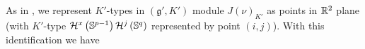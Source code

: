 \documentclass[10pt]{article} %
\theoremstyle{definition}
\begin{document}
	As in \cite{howe1993homogeneous}, we represent $K'$-types in $(\mathfrak{g}',K')$ module $J(\nu)_{K'}$ as points in $\mathbb{R}^2$ plane (with $K'$-type $\mathcal{H}^{x}\left( \mathbb{S}^{p-1} \right)
	\mathcal{H}^j\left( \mathbb{S}^q \right)$ represented by point $(i,j)$). With this identification we have
\end{document}
